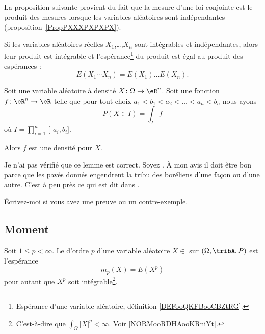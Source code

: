 La proposition suivante provient du fait que la mesure d'une loi conjointe est le produit des mesures lorsque les variables aléatoires sont indépendantes (proposition~\ref{PropPXXXPXPXPX}).
\begin{proposition}           \label{PROPooDKQDooREiSSf}
	Si les variables aléatoires réelles \( X_1\),\ldots,\( X_n\) sont intégrables et indépendantes, alors leur produit est intégrable et l'espérance\footnote{Espérance d'une variable aléatoire, définition \ref{DEFooQKFBooCBZtRG}.} du produit est égal au produit des espérances :
	\begin{equation}
		E(X_1\cdots X_n)=E(X_1)\ldots E(X_n).
	\end{equation}
\end{proposition}

\begin{lemma}       \label{LEMooIVIWooUUVStW}
	Soit une variable aléatoire à densité \( X\colon \Omega\to \eR^n\). Soit une fonction \( f\colon \eR^n\to \eR\) telle que pour tout choix \( a_1<b_1<a_2<\ldots <a_n<b_n\) nous ayons
	\begin{equation}
		P(X\in I)=\int_I f
	\end{equation}
	où \( I=\prod_{i=1}^n\mathopen] a_i , b_i \mathclose]\).

	Alors \( f\) est une densité pour \( X\).

	\begin{probleme}		\label{PROBooAHJSooWUuJhb}
		Je n'ai pas vérifié que ce lemme est correct. Soyez . À mon avis il doit être bon parce que les pavés donnés engendrent la tribu des boréliens d'une façon ou d'une autre. C'est à peu près ce qui est dit dans \cite{BIBooMECWooHQJweh}.

		Écrivez-moi si vous avez une preuve ou un contre-exemple.
	\end{probleme}
\end{lemma}


\subsection{Moment}

\begin{definition}		\label{DEFooTECPooMzGYgG}
	Soit \( 1\leq p<\infty\). Le  d'ordre \( p\) d'une variable aléatoire \( X\in\) sur \( (\Omega,\tribA,P)\) est l'espérance
	\begin{equation}
		m_p(X)=E(X^p)
	\end{equation}
	pour autant que \( X^p\) soit intégrable\footnote{C'est-à-dire que \( \int_{\Omega}| X |^p<\infty\). Voir \ref{NORMooRDHAooKRniYt}.}.
\end{definition}


